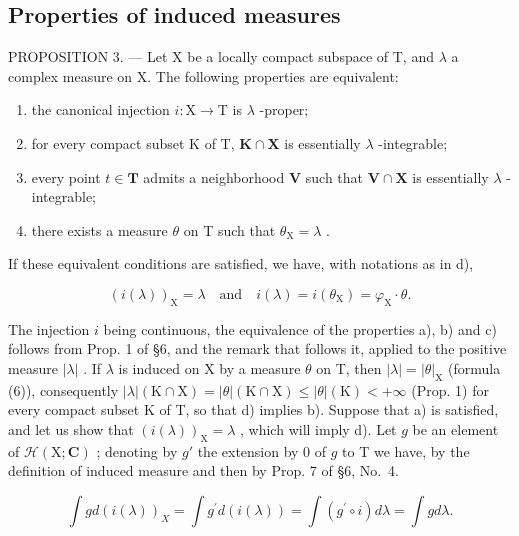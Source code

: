 \subsection{Properties of induced measures}

PROPOSITION 3. --- Let X be a locally compact subspace of T, and \(\lambda\) a complex measure on X. The following properties are equivalent:

\begin{enumerate}
\def\labelenumi{\alph{enumi})}
\item
  the canonical injection \(i:\mathrm{X}\to \mathrm{T}\) is \(\lambda\) -proper;
\item
  for every compact subset K of T, \(\mathbf{K} \cap \mathbf{X}\) is essentially \(\lambda\) -integrable;
\item
  every point \(t \in \mathbf{T}\) admits a neighborhood \(\mathbf{V}\) such that \(\mathbf{V} \cap \mathbf{X}\) is essentially \(\lambda\) -integrable;
\item
  there exists a measure \(\theta\) on T such that \(\theta_{\mathrm{X}} = \lambda\) .
\end{enumerate}

If these equivalent conditions are satisfied, we have, with notations as in d),

\[
\left(i (\lambda)\right) _ {\mathrm{X}} = \lambda \quad \text{and} \quad i (\lambda) = i (\theta_ {\mathrm{X}}) = \varphi_ {\mathrm{X}} \cdot \theta .\tag{7}
\]

The injection \(i\) being continuous, the equivalence of the properties a), b) and c) follows from Prop. 1 of §6, and the remark that follows it, applied to the positive measure \(|\lambda|\) . If \(\lambda\) is induced on X by a measure \(\theta\) on T, then \(|\lambda| = |\theta|_{\mathrm{X}}\) (formula (6)), consequently \(|\lambda| (\mathrm{K} \cap \mathrm{X}) = |\theta| (\mathrm{K} \cap \mathrm{X}) \leqslant |\theta| (\mathrm{K}) < +\infty\) (Prop. 1) for every compact subset K of T, so that d) implies b). Suppose that a) is satisfied, and let us show that \(\left(i(\lambda)\right)_{\mathrm{X}} = \lambda\) , which will imply d). Let \(g\) be an element of \(\mathcal{H}(\mathrm{X}; \mathbf{C})\) ; denoting by \(g'\) the extension by 0 of \(g\) to T we have, by the definition of induced measure and then by Prop. 7 of §6, No.~4.

\[
\int g d (i (\lambda)) _ {X} = \int g ^ {\prime} d (i (\lambda)) = \int (g ^ {\prime} \circ i) d \lambda = \int g d \lambda .
\]

